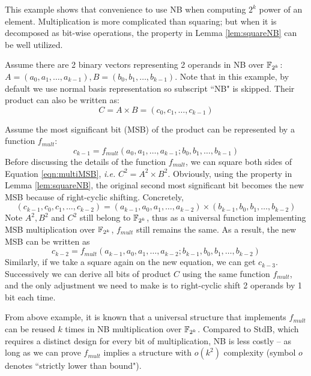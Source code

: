 This example shows that convenience to use NB when computing $2^k$ power of an element.
Multiplication is more complicated than squaring; but when it is decomposed as bit-wise
operations, the property in Lemma \ref{lem:squareNB} can be well utilized.

\begin{Example}
Assume there are 2 binary vectors representing 2 operands in NB over ${\mathbb{F}}_{2^k}$: 
$A = (a_0, a_1, \dots, a_{k-1}), B = (b_0, b_1, \dots, b_{k-1})$. Note that in this example, 
by default we use normal basis representation so subscript ``NB" is skipped. Their product can also be written
as: $$C = A\times B = (c_0, c_1, \dots, c_{k-1})$$

Assume the most significant bit (MSB) of the product can be represented by a function $f_{mult}$: 
\begin{equation}
\label{eqn:multiMSB}
c_{k-1} = f_{mult}(a_0, a_1, \dots, a_{k-1}; b_0, b_1, \dots, b_{k-1})
\end{equation}
Before discussing the details of the function $f_{mult}$, we can 
square both sides of Equation \ref{eqn:multiMSB}, {\it i.e.} $C^2 = A^2\times B^2$.
Obviously, using the property in Lemma \ref{lem:squareNB}, the original second most significant bit 
becomes the new MSB because of right-cyclic shifting. 
Concretely, 
$$(c_{k-1},c_0,c_1,\dots,c_{k-2}) = (a_{k-1},a_0,a_1,\dots,a_{k-2})\times(b_{k-1},b_0,b_1,\dots,b_{k-2})$$
Note $A^2, B^2$ and $C^2$ still belong to ${\mathbb{F}}_{2^k}$, thus as a universal function implementing MSB multiplication
over ${\mathbb{F}}_{2^k}$, $f_{mult}$ still remains the same. As a result, the new MSB can be written as 
\begin{equation}
\label{eqn:shiftMSB}
c_{k-2} = f_{mult}(a_{k-1}, a_0, a_1, 
\dots, a_{k-2}; b_{k-1}, b_0, b_1, \dots, b_{k-2})
\end{equation}
Similarly, if we take a square again on the new equation, we can get $c_{k-3}$.
Successively we can derive all bits of product $C$ using the same function $f_{mult}$, and the only
adjustment we need to make is to right-cyclic shift 2 operands by 1 bit each time.
\end{Example}

From above example, it is known that a universal structure that implements $f_{mult}$ can be reused
$k$ times in NB multiplication over ${\mathbb{F}}_{2^k}$. Compared to StdB, which requires a distinct design 
for every bit of multiplication, NB is less costly -- as long as we can prove $f_{mult}$ implies 
a structure with $o(k^2)$ complexity (symbol $o$ denotes ``strictly lower than bound"). 

